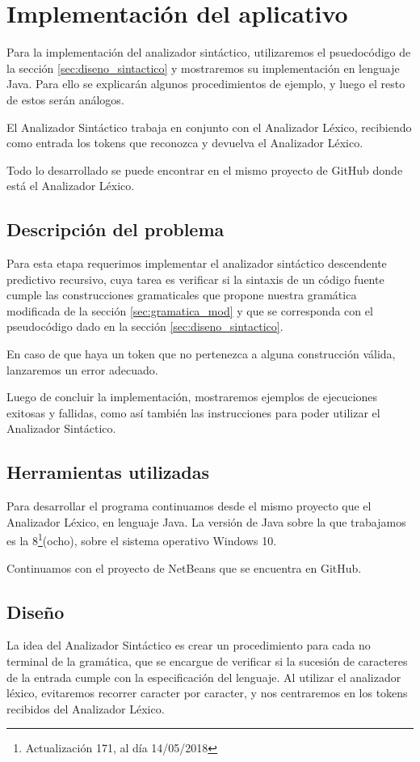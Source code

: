 \section{Implementación del aplicativo}
Para la implementación del analizador sintáctico, utilizaremos el psuedocódigo de la sección \ref{sec:diseno_sintactico} y mostraremos su implementación en lenguaje Java. Para ello se explicarán algunos procedimientos de ejemplo, y luego el resto de estos serán análogos.

El Analizador Sintáctico trabaja en conjunto con el Analizador Léxico, recibiendo como entrada los tokens que reconozca y devuelva el Analizador Léxico.

Todo lo desarrollado se puede encontrar en el mismo proyecto de GitHub donde está el Analizador Léxico.

\subsection{Descripción del problema}
Para esta etapa requerimos implementar el analizador sintáctico descendente predictivo recursivo, cuya tarea es verificar si la sintaxis de un código fuente cumple las construcciones gramaticales que propone nuestra gramática modificada de la sección \ref{sec:gramatica_mod} y que se corresponda con el pseudocódigo dado en la sección \ref{sec:diseno_sintactico}. 

En caso de que haya un token que no pertenezca a alguna construcción válida, lanzaremos un error adecuado.

Luego de concluir la implementación, mostraremos ejemplos de ejecuciones exitosas y fallidas, como así también las instrucciones para poder utilizar el Analizador Sintáctico.

\subsection{Herramientas utilizadas}
Para desarrollar el programa continuamos desde el mismo proyecto que el Analizador Léxico, en lenguaje Java. La versión de Java sobre la que trabajamos es la 8\footnote{Actualización 171, al día 14/05/2018}(ocho), sobre el sistema operativo Windows 10. 

Continuamos con el proyecto de NetBeans que se encuentra en GitHub.

\subsection{Diseño}
La idea del Analizador Sintáctico es crear un procedimiento para cada no terminal de la gramática, que se encargue de verificar si la sucesión de caracteres de la entrada cumple con la especificación del lenguaje. Al utilizar el analizador léxico, evitaremos recorrer caracter por caracter, y nos centraremos en los tokens recibidos del Analizador Léxico. 

